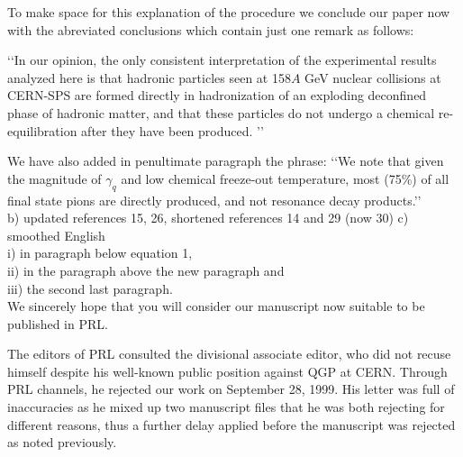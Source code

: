 \begin{mdframed}[linecolor=gray,roundcorner=12pt,backgroundcolor=Dandelion!15,linewidth=1pt,leftmargin=0cm,rightmargin=0cm,topline=true,bottomline=true,skipabove=12pt]
To make space for this explanation of the procedure we conclude our paper now with the abreviated conclusions which contain just one remark as follows:

\lq\lq In our opinion, the only consistent interpretation of the experimental results analyzed here is that hadronic particles seen at 158$A$ GeV nuclear collisions at CERN-SPS are formed directly in hadronization of an exploding deconfined phase of hadronic matter, and that these particles do not undergo a chemical re-equilibration after they have been produced. \rq\rq\
 
 
We have also added in penultimate paragraph the phrase: \lq\lq We note that given the magnitude of $\gamma_q$ and low chemical freeze-out temperature, most (75\%) of all final state pions are directly produced, and not resonance decay products.\rq\rq\\
b) updated references 15, 26, shortened references 14 and 29 (now 30) 
c) smoothed English\\
 i) in paragraph below equation 1,\\
 ii) in the paragraph above the new paragraph and \\
iii) the second last paragraph.\\


We sincerely hope that you will consider our manuscript 
now suitable to be published in PRL.
\end{mdframed}
\vskip 0.5cm

The editors of PRL consulted  the  divisional associate editor, who did not recuse himself despite his well-known public position against QGP at CERN. Through PRL channels, he rejected our work on September 28, 1999. His letter was full of inaccuracies as he mixed up two manuscript files that he was both rejecting for different reasons, thus a further delay applied before the manuscript was rejected as noted previously.  

